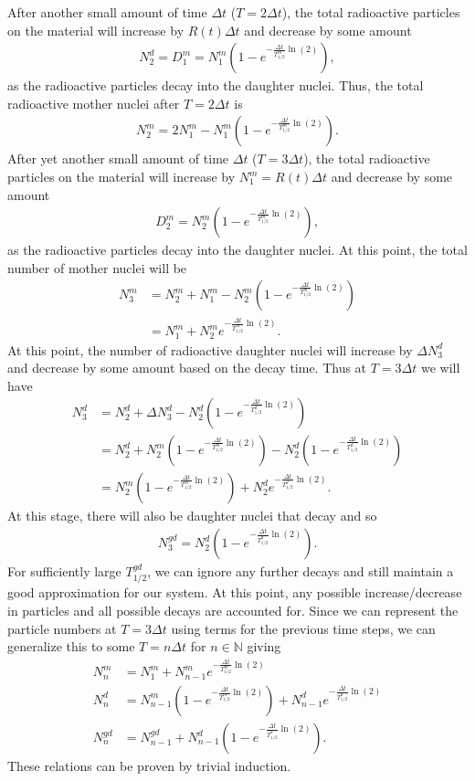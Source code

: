 After another small amount of time $\Delta t$ ($T=2\Delta t$), the total radioactive particles on the material will increase by $R(t)\Delta t$ and decrease by some amount 
\begin{align}
N^d_2=D^m_1=N^m_1\left(1-e^{-\frac{\Delta t}{T^m_{1/2}}\ln(2)}\right),
\end{align} 
as the radioactive particles decay into the daughter nuclei. Thus, the total radioactive mother nuclei after $T=2\Delta t$ is \begin{align}
N^m_2=2N^m_1 - N^m_1\left(1-e^{-\frac{\Delta t}{T^m_{1/2}}\ln(2)}\right).
\end{align}
After yet another small amount of time $\Delta t$ ($T=3\Delta t$), the total radioactive particles on the material will increase by $N^m_1=R(t)\Delta t$ and decrease by some amount
\begin{align}
D^m_2 = N^m_2\left(1-e^{-\frac{\Delta t}{T^m_{1/2}}\ln(2)}\right),
\end{align} 
as the radioactive particles decay into the daughter nuclei. At this point, the total number of mother nuclei will be
\begin{align}
N^m_3 &= N^m_2+N^m_1-N^m_2\left(1-e^{-\frac{\Delta t}{T^m_{1/2}}\ln(2)}\right) \\
&= N^m_1+N^m_2e^{-\frac{\Delta t}{T^m_{1/2}}\ln(2)}.
\end{align}
At this point, the number of radioactive daughter nuclei will increase by $\Delta N^d_3$ and decrease by some amount based on the decay time. Thus at $T=3\Delta t$ we will have
\begin{align}
N^d_3 &= N^d_2+\Delta N^d_3-N^d_2\left(1-e^{-\frac{\Delta t}{T^d_{1/2}}\ln(2)}\right) \\
&=N^d_2+N^m_2\left(1-e^{-\frac{\Delta t}{T^m_{1/2}}\ln(2)}\right)-N^d_2\left(1-e^{-\frac{\Delta t}{T^d_{1/2}}\ln(2)}\right) \\
&=N^m_2\left(1-e^{-\frac{\Delta t}{T^m_{1/2}}\ln(2)}\right)+N^d_2e^{-\frac{\Delta t}{T^d_{1/2}}\ln(2)}.
\end{align}
At this stage, there will also be daughter nuclei that decay and so 
\begin{align}
N^{gd}_3 = N^d_2\left(1-e^{-\frac{\Delta t}{T^d_{1/2}}\ln(2)}\right).
\end{align}
For sufficiently large $T^{gd}_{1/2}$, we can ignore any further decays and still maintain a good approximation for our system. At this point, any possible increase/decrease in particles and all possible decays are accounted for. Since we can represent the particle numbers at $T=3\Delta t$ using terms for the previous time steps, we can generalize this to some $T=n\Delta t$ for $n\in\mathbb{N}$ giving
\begin{align}
N^m_n &= N^m_1+N^m_{n-1}e^{-\frac{\Delta t}{T^m_{1/2}}\ln(2)} \label{Nm} \\
N^d_n &= N^m_{n-1}\left(1-e^{-\frac{\Delta t}{T^m_{1/2}}\ln(2)}\right)+N^d_{n-1}e^{-\frac{\Delta t}{T^d_{1/2}}\ln(2)}\label{Nd} \\
N^{gd}_n &= N^{gd}_{n-1}+N^d_{n-1}\left(1-e^{-\frac{\Delta t}{T^d_{1/2}}\ln(2)}\right). \label{Ngd}
\end{align}
These relations can be proven by trivial induction.

